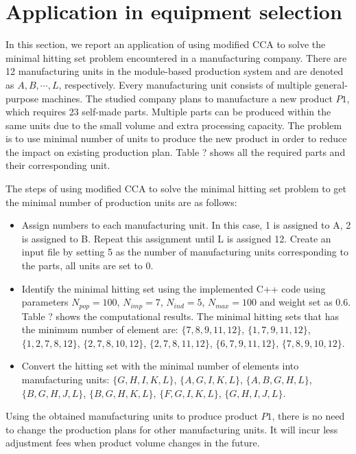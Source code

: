 \section{Application in equipment selection}
In this section, we report an application of using modified CCA to solve the minimal hitting set problem encountered in a manufacturing company.
There are 12 manufacturing units in the module-based production system and are denoted as $A, B, \cdots, L$, respectively.
Every manufacturing unit consists of multiple general-purpose machines.
The studied company plans to manufacture a new product $P1$, which requires 23 self-made parts.
Multiple parts can be produced within the same units due to the small volume and extra processing capacity.
The problem is to use minimal number of units to produce the new product in order to reduce the impact on existing production plan.
Table ? shows all the required parts and their corresponding unit.





The steps of using modified CCA to solve the minimal hitting set problem  to get the minimal number of production units are as follows:
\begin{itemize}
	\item Assign numbers to each manufacturing unit. In this case, 1 is assigned to A, 2 is assigned to B. Repeat this assignment until L is assigned 12. Create an input file by setting 5 as the number of manufacturing units corresponding to the parts, all units are set to 0.
	\item Identify the minimal hitting set using the implemented C++ code using parameters $N_{pop} = 100$, $N_{imp} = 7$, $N_{ind} = 5$, $N_{max} = 100$ and weight set as 0.6. Table ? shows the computational results.
	The minimal hitting sets that has the minimum number of element are: $\{7,8,9,11,12\}$,  $\{1,7,9,11,12\}$, $\{1,2,7,8,12\}$, $\{2,7,8,10,12\}$, $\{2,7,8,11,12\}$, $\{6,7,9,11,12\}$, $\{7,8,9,10,12\}$.
	\item Convert the hitting set with the minimal number of elements into manufacturing units: $\{G,H,I,K,L\}$, $\{A,G,I,K,L\}$, $\{A,B,G,H,L\}$, $\{B,G,H,J,L\}$, $\{B,G,H,K,L\}$, $\{F,G,I,K,L\}$, $\{G,H,I,J,L\}$.
\end{itemize}

Using the obtained manufacturing units to produce product $P1$, there is no need to change the production plans for other manufacturing units.
It will incur less adjustment fees when product volume changes in the future.





